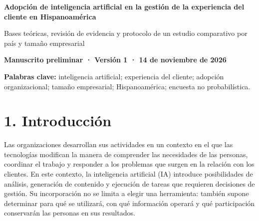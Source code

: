 \documentclass[12pt,letterpaper]{article}
\begin{document}
\begin{center}{\Large\bfseries Adopción de inteligencia artificial en la gestión de la experiencia del cliente en Hispanoamérica\par}\end{center}
\begin{center}\large Bases teóricas, revisión de evidencia y protocolo de un estudio comparativo por país y tamaño empresarial\end{center}
\textbf{Manuscrito preliminar · Versión 1 · 14 de noviembre de 2026}

\begin{abstract}\normalsize
La incorporación de inteligencia artificial en las organizaciones plantea preguntas sobre las actividades que se transforman, las condiciones de implementación y la experiencia que se ofrece a los clientes. Sin embargo, utilizar una herramienta no equivale a integrarla en los procesos de la empresa, ni constituye por sí mismo evidencia de una mejor experiencia. Este manuscrito articula una revisión crítica de literatura en management, marketing y servicios con el protocolo de una encuesta empresarial en Hispanoamérica. Se propone un estudio cuantitativo, observacional, no experimental y transversal, de alcance descriptivo, comparativo y asociativo. La unidad de análisis será la operación empresarial declarada por un informante, diferenciando operaciones nacionales de respuestas regionales multinacionales. La captación será no probabilística y orientada por cuotas de país y tamaño. Se establece una meta operativa de 2.800 unidades elegibles, con tamaño conocido y sin duplicación identificada, distribuida en siete grupos de reporte y cuatro bandas de personal. Un piloto de 50 envíos admitidos permitirá revisar comprensión y funcionamiento del instrumento. El cuestionario distinguirá adopción habitual, uso reciente, integración de información, tecnologías, barreras y cambio percibido en la experiencia del cliente. Se explicitan los límites de selección, medición e inferencia, así como los requisitos pendientes antes del campo formal. El documento no contiene resultados del estudio ni análisis de datos de participantes.

\end{abstract}
\noindent \textbf{Palabras clave:} inteligencia artificial; experiencia del cliente; adopción organizacional; tamaño empresarial; Hispanoamérica; encuesta no probabilística.
\clearpage
\section*{1. Introducción}
Las organizaciones desarrollan sus actividades en un contexto en el que las tecnologías modifican la manera de comprender las necesidades de las personas, coordinar el trabajo y responder a los problemas que surgen en la relación con los clientes. En este contexto, la inteligencia artificial (IA) introduce posibilidades de análisis, generación de contenido y ejecución de tareas que requieren decisiones de gestión. Su incorporación no se limita a elegir una herramienta: también supone determinar para qué se utilizará, con qué información operará y qué participación conservarán las personas en sus resultados.
\end{document}
